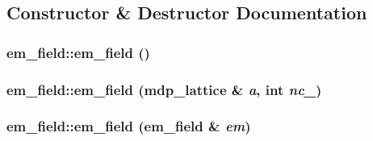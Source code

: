 \subsection{Constructor \& Destructor Documentation}
\hypertarget{classem__field_a919bf7292d3c2748663f48d325ea2fa3}{
\subsubsection[{em\_\-field}]{\setlength{\rightskip}{0pt plus 5cm}em\_\-field::em\_\-field ()}}
\label{classem__field_a919bf7292d3c2748663f48d325ea2fa3}
\hypertarget{classem__field_a15c0bc41753d8728c251f51b48e0f1ea}{
\subsubsection[{em\_\-field}]{\setlength{\rightskip}{0pt plus 5cm}em\_\-field::em\_\-field ({\bf mdp\_\-lattice} \& {\em a}, \/  int {\em nc\_\-})}}
\label{classem__field_a15c0bc41753d8728c251f51b48e0f1ea}
\hypertarget{classem__field_ab061ffebdbd768362b56121237c1ac80}{
\subsubsection[{em\_\-field}]{\setlength{\rightskip}{0pt plus 5cm}em\_\-field::em\_\-field ({\bf em\_\-field} \& {\em em})}}
\label{classem__field_ab061ffebdbd768362b56121237c1ac80}


